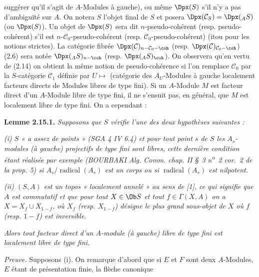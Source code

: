 suggérer qu'il s'agit de \(A\)-Modules à gauche), ou même \(\Dpx(S)\) s'il n'y a pas d'ambiguïté sur \(A\). On notera \(S\) l'objet final de \(S\) et posera \(\Dpx(\mathcal C_S)=\Dpx({}_A S)\) (ou \(\Dpx(S)\)). Un objet de \(\Dpx(S)\) sera dit \(n\)-pseudo-cohérent (resp. pseudo-cohérent) s'il est \(n\)-\(\mathcal C_0\)-pseudo-cohérent (resp. \(\mathcal C_0\)-pseudo-cohérent) (itou pour les notions strictes). La catégorie fibrée \(\Dpx(\mathcal C)_{n-\mathcal C_0-\coh}\) (resp. \(\Dpx(\mathcal C)_{\mathcal C_0-\coh}\)) (2.6) sera notée \(\Dpx({}_A S)_{n-\coh}\) (resp. \(\Dpx({}_A S)_{\coh}\)). On observera qu'en vertu de (2.14) on obtient la même notion de pseudo-cohérence si l'on remplace \(\mathcal C_0\) par la \(S\)-catégorie \(\mathcal C_1\) définie par \(U\longmapsto\) (catégorie des \(A_U\)-Modules à gauche localement facteurs directs de Modules libres de type fini). Si un \(A\)-Module \(M\) est facteur direct d'un \(A\)-Module libre de type fini, il ne s'ensuit pas, en général, que \(M\) est localement libre de type fini. On a cependant :

\textbf{Lemme 2.15.1.} \emph{Supposons que \(S\) vérifie l'une des deux hypothèses suivantes :}

\emph{(i) \(S\) « a assez de points » (SGA 4 IV 6.4) et pour tout point \(s\) de \(S\) les \(A_s\)-modules (à gauche) projectifs de type fini sont libres, cette dernière condition étant réalisée par exemple (BOURBAKI Alg. Comm. chap. II \S~3 n\textsuperscript{o}~2 cor.~2 de la prop. 5) si \(A_s/\operatorname{radical}(A_s)\) est un corps ou si \(\operatorname{radical}(A_s)\) est nilpotent.}

\emph{(ii) \((S,A)\) est un topos « localement annelé » au sens de [1], ce qui signifie que \(A\) est commutatif et que pour tout \(X\in\Ob S\) et tout \(f\in\Gamma(X,A)\) on a \(X=X_f\cup X_{1-f}\), où \(X_f\) (resp. \(X_{1-f}\)) désigne le plus grand sous-objet de \(X\) où \(f\) (resp. \(1-f\)) est inversible.}

\emph{Alors tout facteur direct d'un \(A\)-module (à gauche) libre de type fini est localement libre de type fini.}

\emph{Preuve.} Supposons (i). On remarque d'abord que si \(E\) et \(F\) sont deux \(A\)-Modules, \(E\) étant de présentation finie, la flèche canonique
